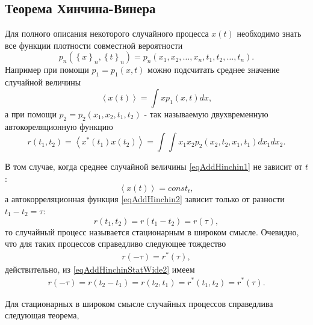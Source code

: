 \subsection{Теорема Хинчина-Винера}
Для полного описания некоторого случайного процесса $x\left(t\right)$
необходимо знать все функции плотности совместной вероятности
\[
p_n\left(\left\{x\right\}_n,\left\{t\right\}_n\right) = 
p_n\left(x_1,x_2,\dots,x_n,t_1,t_2,\dots,t_n\right).
\] 
Например при помощи $p_1 = p_1\left(x,t\right)$ можно подсчитать среднее 
значение случайной величины
\begin{equation}
\left<x\left(t\right)\right> = \int x p_1\left(x,t\right) dx,
\label{eqAddHinchin1}
\end{equation}
а при помощи $p_2 = p_2\left(x_1,x_2,t_1,t_2\right)$ - так называемую
двухвременную автокореляционную функцию  
\begin{equation}
r\left(t_1, t_2\right) = \left<x^{*}\left(t_1\right) x\left(t_2\right)\right> = \int
\int x_1 x_2 p_2\left(x_2,t_2,x_1,t_1\right)dx_1 dx_2.
\label{eqAddHinchin2}
\end{equation}

В том случае, когда среднее случайной величины \eqref{eqAddHinchin1} не
зависит от $t$:
\begin{equation}
\left<x\left(t\right)\right> = const_t,
\label{eqAddHinchinStatWide1}
\end{equation}
а автокорреляционная функция \eqref{eqAddHinchin2} зависит только от
разности $t_1 - t_2 = \tau$:
\begin{equation}
r\left(t_1, t_2\right) = r\left(t_1 - t_2\right) = r\left(\tau\right),
\label{eqAddHinchinStatWide2}
\end{equation}
то случайный процесс называется стационарным в широком
смысле. Очевидно, что для таких процессов справедливо следующее
тождество
\begin{eqnarray}
r\left(- \tau\right) = r^{*}\left(\tau\right),
\label{eqAddHinchinStatWide3}
\end{eqnarray}
действительно, из \eqref{eqAddHinchinStatWide2} имеем
\begin{eqnarray}
r\left(- \tau\right) = r\left(t_2 - t_1\right) = r\left(t_2,
t_1\right) = r^{*}\left(t_1, t_2\right) = r^{*}\left(\tau\right).
\nonumber
\end{eqnarray}


Для стационарных в широком смысле случайных процессов справедлива
следующая теорема,

